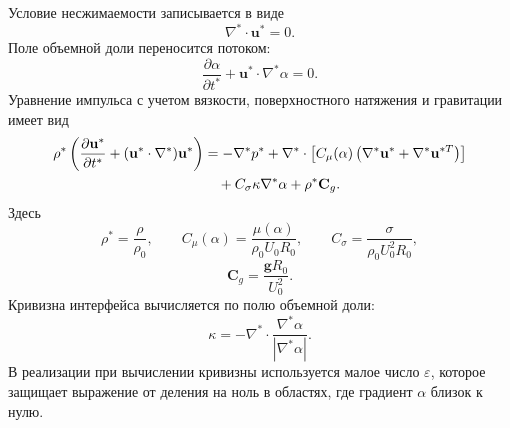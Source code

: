 \documentclass[12pt,a4paper]{article}
\newcommand{\Rbase}{R_0}
\newcommand{\Uref}{U_0}
\newcommand{\rhoref}{\rho_0}
\begin{document}
Условие несжимаемости записывается в виде
\begin{equation}
    \nabla^*\cdot\mathbf{u}^*=0.
    \label{eq:chapter2_mass}
\end{equation}
Поле объемной доли переносится потоком:
\begin{equation}
    \frac{\partial\alpha}{\partial t^*}
    +\mathbf{u}^*\cdot\nabla^*\alpha=0.
    \label{eq:chapter2_alpha_transport}
\end{equation}
Уравнение импульса с учетом вязкости, поверхностного натяжения и гравитации
имеет вид
\begin{align}
    \rho^*
    \left(
        \frac{\partial\mathbf{u}^*}{\partial t^*}
        +(\mathbf{u}^*\cdot\nabla^*)\mathbf{u}^*
    \right)
    &=
    -\nabla^*p^*
    +\nabla^*\cdot
    \left[
        C_\mu(\alpha)
        \left(\nabla^*\mathbf{u}^*+\nabla^*\mathbf{u}^{*T}\right)
    \right]
    \notag\\
    &\quad
    +C_\sigma\kappa\nabla^*\alpha
    +\rho^*\mathbf{C}_g.
    \label{eq:chapter2_momentum}
\end{align}
Здесь
\[
    \rho^*=\frac{\rho}{\rhoref},
    \qquad
    C_\mu(\alpha)=\frac{\mu(\alpha)}{\rhoref\Uref\Rbase},
    \qquad
    C_\sigma=\frac{\sigma}{\rhoref\Uref^2\Rbase},
\]
\[
    \mathbf{C}_g=\frac{\mathbf{g}\Rbase}{\Uref^2}.
\]
Кривизна интерфейса вычисляется по полю объемной доли:
\begin{equation}
    \kappa
    =
    -\nabla^*\cdot
    \frac{\nabla^*\alpha}{|\nabla^*\alpha|}.
    \label{eq:chapter2_curvature}
\end{equation}
В реализации при вычислении кривизны используется малое число
\(\varepsilon\), которое защищает выражение от деления на ноль в областях, где
градиент \(\alpha\) близок к нулю.
\end{document}
